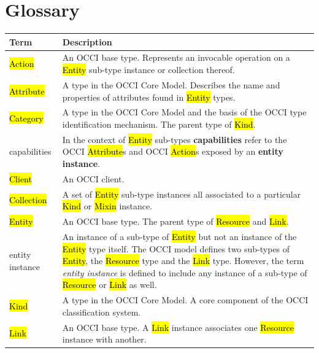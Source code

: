 \documentclass[10pt,a4paper]{article}
\begin{document}
\section{Glossary}
\label{sec:glossary}
%

\begin{tabular}{l|p{12cm}}
Term & Description \\
\hline
\hl{Action} & An OCCI base type. Represents an invocable operation on a \hl{Entity} sub-type instance or collection thereof. \\

\hl{Attribute} & A type in the OCCI Core Model. Describes the name and properties of attributes found in \hl{Entity} types. \\

\hl{Category} & A type in the OCCI Core Model and the basis of the OCCI type identification mechanism. The parent type of \hl{Kind}. \\

capabilities & In the context of \hl{Entity} sub-types {\bf  capabilities} refer
  to the OCCI \hl{Attribute}s and OCCI \hl{Action}s exposed by an {\bf entity
  instance}. \\

\hl{Client} & An OCCI client.\\

\hl{Collection} & A set of \hl{Entity} sub-type instances all associated to a particular \hl{Kind} or \hl{Mixin} instance. \\

\hl{Entity} & An OCCI base type. The parent type of \hl{Resource} and \hl{Link}. \\

entity instance & An instance of a sub-type of \hl{Entity} but not an instance
  of the \hl{Entity} type itself.  The OCCI model defines two sub-types of
  \hl{Entity}, the \hl{Resource} type and the \hl{Link} type.  However, the
  term {\em entity instance} is defined to include any instance of a
  sub-type of \hl{Resource} or \hl{Link} as well. \\

\hl{Kind} & A type in the OCCI Core Model. A core component of the OCCI classification system. \\

\hl{Link} & An OCCI base type. A \hl{Link} instance associates one \hl{Resource} instance with another. \\


\end{tabular}
\end{document}
